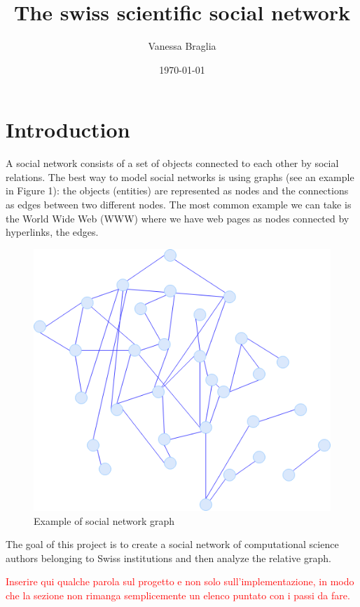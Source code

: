 \documentclass[12 pt]{article}
\author{Vanessa Braglia}
\title{The swiss scientific social network}
\date{\today}
\begin{document}
\selectfont
\maketitle 
\newpage
\tableofcontents
\newpage
\section{Introduction}
A social network consists of a set of objects connected to each other by social relations. The best way to model social networks is using graphs (see an example in Figure 1): the objects (entities) are represented as nodes and the connections as edges between two different nodes. The most common example we can take is the World Wide Web (WWW) where we have web pages as nodes connected by hyperlinks, the edges.

\begin{figure} [h!]
\centering 
\includegraphics[scale=0.3]{./img/graph3.png}
\caption{Example of social network graph}
\end{figure}

The goal of this project is to create a social network of computational science authors belonging to Swiss institutions and then analyze the relative graph.

\textcolor{red}{Inserire qui qualche parola sul progetto e non solo sull'implementazione, in modo che la sezione non rimanga semplicemente un elenco puntato con i passi da fare.}
\end{document}
